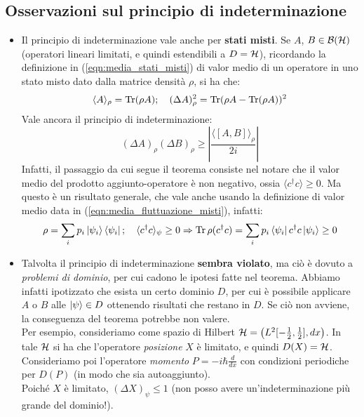 \documentclass[../../FisicaTeorica.tex]{subfiles}
\begin{document}
\subsection{Osservazioni sul principio di indeterminazione}
\begin{itemize}
\item Il principio di indeterminazione vale anche per \textbf{stati misti}. Se $A$, $B \in \mathcal{B}(\mathcal{H})$ (operatori lineari limitati, e quindi estendibili a $D=\mathcal{H}$), ricordando la definizione in (\ref{eqn:media_stati_misti}) di valor medio di un operatore in uno stato misto dato dalla matrice densità $\rho$, si ha che:
\begin{equation}
\langle A\rangle_\rho = \operatorname{Tr} (\rho A); \quad (\Delta A)^2_\rho = \operatorname{Tr}(\rho A-\operatorname{Tr}(\rho A))^2
\label{eqn:media_fluttuazione_misti}
\end{equation}
Vale ancora il principio di indeterminazione:
\[
(\Delta A)_\rho (\Delta B)_\rho \geq \left |
\frac{\langle [A,B]\rangle_\rho}{2i}
\right|
\]
Infatti, il passaggio da cui segue il teorema consiste nel notare che il valor medio del prodotto aggiunto-operatore è non negativo, ossia $\langle c^\dag c\rangle \geq 0$. Ma questo è un risultato generale, che vale anche usando la definizione di valor medio data in (\ref{eqn:media_fluttuazione_misti}), infatti:
\[
\rho = \sum_i p_i \Ket{\psi_i}\Bra{\psi_i}; \quad \langle c^\dag c\rangle_\psi \geq 0 \Rightarrow \operatorname{Tr}\rho(c^\dag c)=\sum_i p_i\Bra{\psi_i}c^\dag c\Ket{\psi_i}\geq 0
\]
\item Talvolta il principio di indeterminazione \textbf{sembra violato}, ma ciò è dovuto a \textit{problemi di dominio}, per cui cadono le ipotesi fatte nel teorema. Abbiamo infatti ipotizzato che esista un certo dominio $D$, per cui è possibile applicare $A$ o $B$ alle $\Ket{\psi} \in D$ ottenendo risultati che restano in $D$. Se ciò non avviene, la conseguenza del teorema potrebbe non valere.\\
Per esempio, consideriamo come spazio di Hilbert $\mathcal{H}=\left(L^2[-\frac{1}{2}, \frac{1}{2}], dx\right)$. In tale $\mathcal{H}$ si ha che l'operatore \textit{posizione} $X$ è limitato, e quindi $D(X)=\mathcal{H}$.\\
Consideriamo poi l'operatore \textit{momento} $P=-i\hbar\frac{d}{dx}$ con condizioni periodiche per $D(P)$ (in modo che sia autoaggiunto).\\
Poiché $X$ è limitato, $(\Delta X)_\psi \leq 1$ (non posso avere un'indeterminazione più grande del dominio!).\\

\end{itemize}
\end{document}
